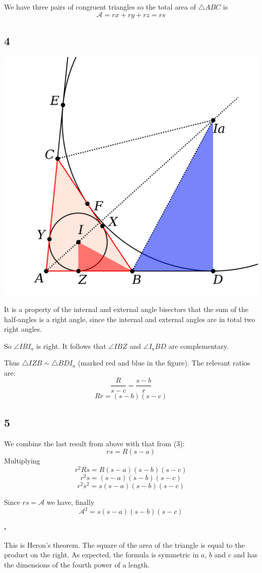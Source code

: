 \documentclass[11pt, oneside]{article}
\begin{document}
We have three pairs of congruent triangles so the total area of $\triangle ABC$ is
\[ \mathcal{A} =  rx + ry + rz = rs \]

\subsection*{4}

\begin{center} \includegraphics [scale=0.40] {excircle_crop2.png} \end{center}

It is a property of the internal and external angle bisectors that the sum of the half-angles is a right angle, since the internal and external angles are in total two right angles.  

So $\angle I B I_a$ is right.  It follows that $\angle IBZ$ and $\angle I_aBD$ are complementary.

Thus $\triangle IZB \sim \triangle BDI_a$ (marked red and blue in the figure).  The relevant ratios are:
\[ \frac{R}{s-c} = \frac{s-b}{r} \]
\[ Rr = (s-b)(s-c) \]

\subsection*{5}

We combine the last result from above with that from (3):
\[ rs = R(s-a) \]
Multiplying
\[ r^2Rs = R(s-a)(s-b)(s-c) \]
\[ r^2s = (s-a)(s-b)(s-c) \]
\[ r^2s^2 = s(s-a)(s-b)(s-c) \]

Since $rs = \mathcal{A}$ we have, finally
\[ \mathcal{A}^2 = s(s-a)(s-b)(s-c) \]

$\square$

This is Heron's theorem.  The square of the area of the triangle is equal to the product on the right.  As expected, the formula is symmetric in $a$, $b$ and $c$ and has the dimensions of the fourth power of a length.
\end{document}
